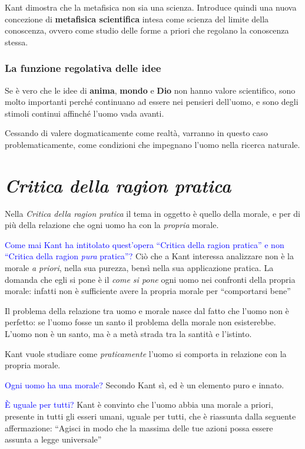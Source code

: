 \documentclass[a4paper, twoside, titlepage]{book}
\renewcommand{\emph}[1]{\textcolor{blue}{#1}}
\begin{document}
Kant dimostra che la metafisica non sia una scienza. Introduce quindi una nuova concezione di \textbf{metafisica scientifica} intesa come scienza del limite della conoscenza, ovvero come studio delle forme a priori che regolano la conoscenza stessa.

\subsection{La funzione regolativa delle idee}

Se è vero che le idee di \textbf{anima}, \textbf{mondo} e \textbf{Dio} non hanno valore scientifico, sono molto importanti perché continuano ad essere nei pensieri dell’uomo, e sono degli stimoli continui affinché l’uomo vada avanti.

Cessando di valere dogmaticamente come realtà, varranno in questo caso problematicamente, come condizioni che impegnano l’uomo nella ricerca naturale.

\chapter{\textit{Critica della ragion pratica}}

Nella \textit{Critica della ragion pratica} il tema in oggetto è quello della morale, e per di più della relazione che ogni uomo ha con la \textit{propria} morale.

\emph{Come mai Kant ha intitolato quest’opera “Critica della ragion pratica” e non “Critica della ragion \textit{pura} pratica”?}
Ciò che a Kant interessa analizzare non è la morale \textit{a priori}, nella sua purezza, bensì nella sua applicazione pratica.
La domanda che egli si pone è il \textit{come si pone} ogni uomo nei confronti della propria morale: infatti non è sufficiente avere la propria morale per “comportarsi bene”

Il problema della relazione tra uomo e morale nasce dal fatto che l’uomo non è perfetto: se l’uomo fosse un santo il problema della morale non esisterebbe.
L’uomo non è un santo, ma è a metà strada tra la santità e l’istinto.

Kant vuole studiare come \textit{praticamente} l’uomo si comporta in relazione con la propria morale.

\emph{Ogni uomo ha una morale?}
Secondo Kant sì, ed è un elemento puro e innato.

\emph{È uguale per tutti?}
Kant è convinto che l’uomo abbia una morale a priori, presente in tutti gli esseri umani, uguale per tutti, che è riassunta dalla seguente affermazione: “Agisci in modo che la massima delle tue azioni possa essere assunta a legge universale”
\end{document}
